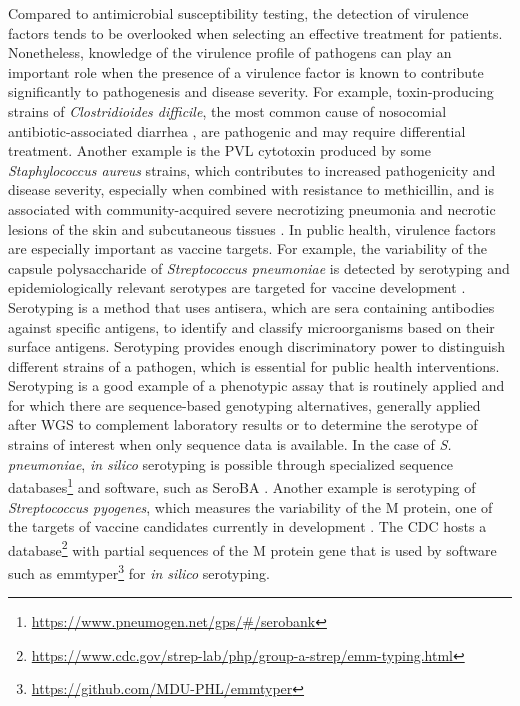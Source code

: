 Compared to antimicrobial susceptibility testing, the detection of virulence factors tends to be overlooked when selecting an effective treatment for patients. Nonetheless, knowledge of the virulence profile of pathogens can play an important role when the presence of a virulence factor is known to contribute significantly to pathogenesis and disease severity. For example, toxin-producing strains of \textit{Clostridioides difficile}, the most common cause of nosocomial antibiotic-associated diarrhea \cite{buddle_pathogenicity_2023}, are pathogenic and may require differential treatment. Another example is the \ac{PVL} cytotoxin produced by some \textit{Staphylococcus aureus} strains, which contributes to increased pathogenicity and disease severity, especially when combined with resistance to methicillin, and is associated with community-acquired severe necrotizing pneumonia and necrotic lesions of the skin and subcutaneous tissues \cite{lina_involvement_1999, vandenesch_community-acquired_nodate, tristan_global_nodate, diep_contribution_2008, lee_methicillin-resistant_2018}. In public health, virulence factors are especially important as vaccine targets. For example, the variability of the capsule polysaccharide of \textit{Streptococcus pneumoniae} is detected by serotyping and epidemiologically relevant serotypes are targeted for vaccine development \cite{henrichsen_six_1995, tarrago_identification_2008, silva-costa_adult_2023, musher_remarkable_2022}. Serotyping is a method that uses antisera, which are sera containing antibodies against specific antigens, to identify and classify microorganisms based on their surface antigens. Serotyping provides enough discriminatory power to distinguish different strains of a pathogen, which is essential for public health interventions. Serotyping is a good example of a phenotypic assay that is routinely applied and for which there are sequence-based genotyping alternatives, generally applied after \ac{WGS} to complement laboratory results or to determine the serotype of strains of interest when only sequence data is available. In the case of \textit{S. pneumoniae}, \textit{in silico} serotyping is possible through specialized sequence databases\footnote{\url{https://www.pneumogen.net/gps/\#/serobank}} and software, such as SeroBA \cite{epping_seroba_2018, lorenz_serobav20_2025}. Another example is serotyping of \textit{Streptococcus pyogenes}, which measures the variability of the M protein, one of the targets of vaccine candidates currently in development \cite{walkinshaw_streptococcus_2023}. The \ac{CDC} hosts a database\footnote{\url{https://www.cdc.gov/strep-lab/php/group-a-strep/emm-typing.html}} with partial sequences of the M protein gene that is used by software such as emmtyper\footnote{\url{https://github.com/MDU-PHL/emmtyper}} for \textit{in silico} serotyping.

